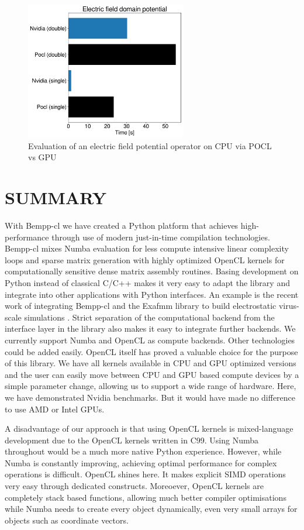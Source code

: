 \begin{figure}
	\center
	\includegraphics[width=7cm]{img/efield_domain_potential.pdf}
	\caption{Evaluation of an electric field potential operator on CPU via POCL vs GPU}
	\label{fig:efield_domain_potential}
\end{figure}

\section{SUMMARY}

With Bempp-cl we have created a Python platform that achieves high-performance through use of modern just-in-time compilation technologies. Bempp-cl mixes Numba evaluation for less compute intensive linear complexity loops and sparse matrix generation with highly optimized OpenCL kernels for computationally sensitive dense matrix assembly routines. Basing development on Python instead of classical C/C++ makes it very easy to adapt the library and integrate into other applications with Python interfaces. An example is the recent work of integrating Bempp-cl and the Exafmm library to build electrostatic virus-scale simulations \cite{bempp_exafmm}. Strict separation of the computational backend from the interface layer in the library also makes it easy to integrate further backends. We currently support Numba and OpenCL as compute backends. Other technologies could be added easily. OpenCL itself has proved a valuable choice for the purpose of this library. We have all kernels available in CPU and GPU optimized versions and the user can easily move between CPU and GPU based compute devices by a simple parameter change, allowing us to support a wide range of hardware. Here, we have demonstrated Nvidia benchmarks. But it would have made no difference to use AMD or Intel GPUs.

A disadvantage of our approach is that using OpenCL kernels is mixed-language development due to the OpenCL kernels written in C99. Using Numba throughout would be a much more native Python experience. However, while Numba is constantly improving, achieving optimal performance for complex operations is difficult. OpenCL shines here. It makes explicit SIMD operations very easy through dedicated constructs. Moreoever, OpenCL kernels are completely stack based functions, allowing much better compiler optimisations while Numba needs to create every object dynamically, even very small arrays for objects such as coordinate vectors.

